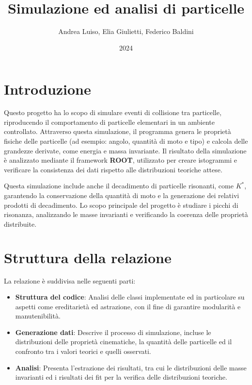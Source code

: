 \documentclass[a4paper,11pt]{article}
\title{Simulazione ed analisi di particelle}
\author{Andrea Luiso, Elia Giulietti, Federico Baldini}
\date{2024}
\begin{document}
\maketitle
\newpage

\tableofcontents
\newpage

\section{Introduzione}

Questo progetto ha lo scopo di simulare eventi di collisione tra particelle, riproducendo il comportamento di particelle elementari in un ambiente controllato. Attraverso questa simulazione, il programma genera le proprietà fisiche delle particelle (ad esempio: angolo, quantità di moto e tipo) e calcola delle grandezze derivate, come energia e massa invariante. Il risultato della simulazione è analizzato mediante il framework \textbf{ROOT}, utilizzato per creare istogrammi e verificare la consistenza dei dati rispetto alle distribuzioni teoriche attese.

Questa simulazione include anche il decadimento di particelle risonanti, come \( K^* \), garantendo la conservazione della quantità di moto e la generazione dei relativi prodotti di decadimento. Lo scopo principale del progetto è studiare i picchi di risonanza, analizzando le masse invarianti e verificando la coerenza delle proprietà distribuite.

\section{Struttura della relazione}

La relazione è suddivisa nelle seguenti parti:

\begin{itemize}
    \item \textbf{Struttura del codice}: Analisi delle classi implementate ed in particolare su aspetti come ereditarietà ed astrazione, con il fine di garantire modularità e manutenibilità.
    \item \textbf{Generazione dati}: Descrive il processo di simulazione, incluse le distribuzioni delle proprietà cinematiche, la quantità delle particelle ed il confronto tra i valori teorici e quelli osservati.
    \item \textbf{Analisi}: Presenta l'estrazione dei risultati, tra cui le distribuzioni delle masse invarianti ed i risultati dei fit per la verifica delle distribuzioni teoriche.
\end{itemize}
\end{document}
